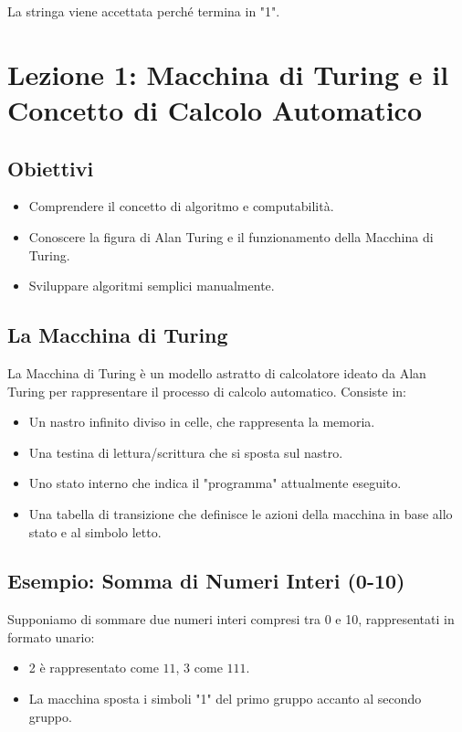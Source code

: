 \documentclass[a4paper,12pt]{report}
\begin{document}
La stringa viene accettata perch\'e termina in "1".


\section*{Lezione 1: Macchina di Turing e il Concetto di Calcolo Automatico}
\subsection*{Obiettivi}
\begin{itemize}
    \item Comprendere il concetto di algoritmo e computabilit\`a.
    \item Conoscere la figura di Alan Turing e il funzionamento della Macchina di Turing.
    \item Sviluppare algoritmi semplici manualmente.
\end{itemize}

\subsection*{La Macchina di Turing}
La Macchina di Turing \`e un modello astratto di calcolatore ideato da Alan Turing per rappresentare il processo di calcolo automatico. Consiste in:
\begin{itemize}
    \item Un nastro infinito diviso in celle, che rappresenta la memoria.
    \item Una testina di lettura/scrittura che si sposta sul nastro.
    \item Uno stato interno che indica il "programma" attualmente eseguito.
    \item Una tabella di transizione che definisce le azioni della macchina in base allo stato e al simbolo letto.
\end{itemize}

\subsection*{Esempio: Somma di Numeri Interi (0-10)}
Supponiamo di sommare due numeri interi compresi tra 0 e 10, rappresentati in formato unario:
\begin{itemize}
    \item 2 \`e rappresentato come $11$, 3 come $111$.
    \item La macchina sposta i simboli "1" del primo gruppo accanto al secondo gruppo.
\end{itemize}
\end{document}
